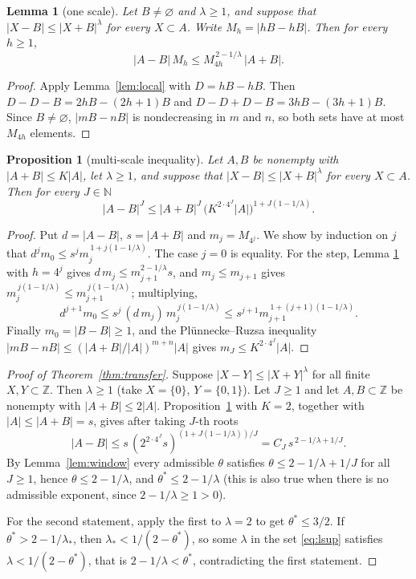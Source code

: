\documentclass[11pt]{amsart}
\newtheorem{lemma}[theorem]{Lemma}
\newtheorem{proposition}[theorem]{Proposition}
\theoremstyle{definition}
\theoremstyle{remark}
\numberwithin{equation}{section}
\newcommand{\N}{\mathbb{N}}
\newcommand{\Z}{\mathbb{Z}}
\newcommand{\lsup}{\lambda_*}
\begin{document}
\begin{lemma}[one scale]\label{lem:onescale}
Let $B\ne\varnothing$ and $\lambda\ge1$, and suppose that $|X-B|\le|X+B|^\lambda$ for every
$X\subset A$. Write $M_h=|hB-hB|$. Then for every $h\ge1$,
\[
  |A-B|\,M_h\le M_{4h}^{\,2-1/\lambda}\,|A+B| .
\]
\end{lemma}

\begin{proof}
Apply Lemma~\ref{lem:local} with $D=hB-hB$. Then $D-D-B=2hB-(2h+1)B$ and
$D-D+D-B=3hB-(3h+1)B$. Since $B\neq\varnothing$, $|mB-nB|$ is nondecreasing in $m$ and $n$, so
both sets have at most $M_{4h}$ elements.
\end{proof}

\begin{proposition}[multi-scale inequality]\label{prop:multiscale}
Let $A,B$ be nonempty with $|A+B|\le K|A|$, let $\lambda\ge1$, and suppose that
$|X-B|\le|X+B|^\lambda$ for every $X\subset A$. Then for every $J\in\N$
\[
  |A-B|^J\le |A+B|^J\,\bigl(K^{2\cdot4^J}|A|\bigr)^{1+J(1-1/\lambda)} .
\]
\end{proposition}

\begin{proof}
Put $d=|A-B|$, $s=|A+B|$ and $m_j=M_{4^j}$. We show by induction on $j$ that
$d^j m_0\le s^j m_j^{\,1+j(1-1/\lambda)}$. The case $j=0$ is equality. For the step, Lemma
\ref{lem:onescale} with $h=4^j$ gives $d\,m_j\le m_{j+1}^{2-1/\lambda}s$, and $m_j\le m_{j+1}$
gives $m_j^{\,j(1-1/\lambda)}\le m_{j+1}^{\,j(1-1/\lambda)}$; multiplying,
\[
  d^{j+1}m_0\le s^j\,(d\,m_j)\,m_j^{\,j(1-1/\lambda)}\le s^{j+1}m_{j+1}^{\,1+(j+1)(1-1/\lambda)} .
\]
Finally $m_0=|B-B|\ge1$, and the Pl\"unnecke--Ruzsa inequality
$|mB-nB|\le(|A+B|/|A|)^{m+n}|A|$ \cite[Theorem~1.2]{Pet12} gives $m_J\le K^{2\cdot4^J}|A|$.
\end{proof}

\begin{proof}[Proof of Theorem~\ref{thm:transfer}]
Suppose $|X-Y|\le|X+Y|^\lambda$ for all finite $X,Y\subset\Z$. Then $\lambda\ge1$ (take
$X=\{0\}$, $Y=\{0,1\}$). Let $J\ge1$ and let $A,B\subset\Z$ be nonempty with $|A+B|\le2|A|$.
Proposition~\ref{prop:multiscale} with $K=2$, together with $|A|\le|A+B|=s$, gives after taking
$J$-th roots
\[
  |A-B|\le s\,(2^{2\cdot4^J}s)^{(1+J(1-1/\lambda))/J}=C_J\,s^{\,2-1/\lambda+1/J}.
\]
By Lemma~\ref{lem:window} every admissible $\theta$ satisfies $\theta\le2-1/\lambda+1/J$ for all
$J\ge1$, hence $\theta\le2-1/\lambda$, and $\theta^\ast\le2-1/\lambda$ (this is also true when
there is no admissible exponent, since $2-1/\lambda\ge1>0$).

For the second statement, apply the first to $\lambda=2$ to get $\theta^\ast\le3/2$. If
$\theta^\ast>2-1/\lsup$, then $\lsup<1/(2-\theta^\ast)$, so some $\lambda$ in the set
\eqref{eq:lsup} satisfies $\lambda<1/(2-\theta^\ast)$, that is $2-1/\lambda<\theta^\ast$,
contradicting the first statement.
\end{proof}
\end{document}
